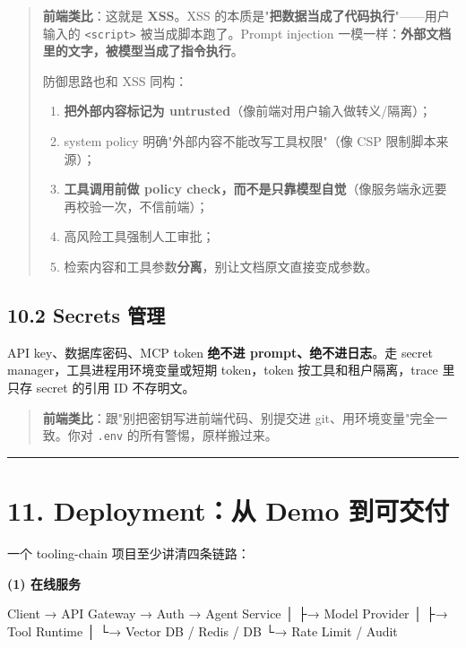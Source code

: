 \begin{quote}
 \textbf{前端类比}：这就是 \textbf{XSS}。XSS 的本质是"\textbf{把数据当成了代码执行}"——用户输入的 \texttt{<script>} 被当成脚本跑了。Prompt injection 一模一样：\textbf{外部文档里的文字，被模型当成了指令执行}。

防御思路也和 XSS 同构：
\begin{enumerate}[leftmargin=2em]
\item \textbf{把外部内容标记为 untrusted}（像前端对用户输入做转义/隔离）；
\item system policy 明确"外部内容不能改写工具权限"（像 CSP 限制脚本来源）；
\item \textbf{工具调用前做 policy check，而不是只靠模型自觉}（像服务端永远要再校验一次，不信前端）；
\item 高风险工具强制人工审批；
\item 检索内容和工具参数\textbf{分离}，别让文档原文直接变成参数。
\end{enumerate}
\end{quote}

\subsection{10.2 Secrets 管理}

API key、数据库密码、MCP token \textbf{绝不进 prompt、绝不进日志}。走 secret manager，工具进程用环境变量或短期 token，token 按工具和租户隔离，trace 里只存 secret 的引用 ID 不存明文。

\begin{quote}
 \textbf{前端类比}：跟"别把密钥写进前端代码、别提交进 git、用环境变量"完全一致。你对 \texttt{.env} 的所有警惕，原样搬过来。
\end{quote}

\bigskip\hrule\bigskip

\section{11. Deployment：从 Demo 到可交付}

一个 tooling-chain 项目至少讲清四条链路：

\textbf{(1) 在线服务}

\begin{codeblock}
Client → API Gateway → Auth → Agent Service
                        │        ├→ Model Provider
                        │        ├→ Tool Runtime
                        │        └→ Vector DB / Redis / DB
                        └→ Rate Limit / Audit
\end{codeblock}

